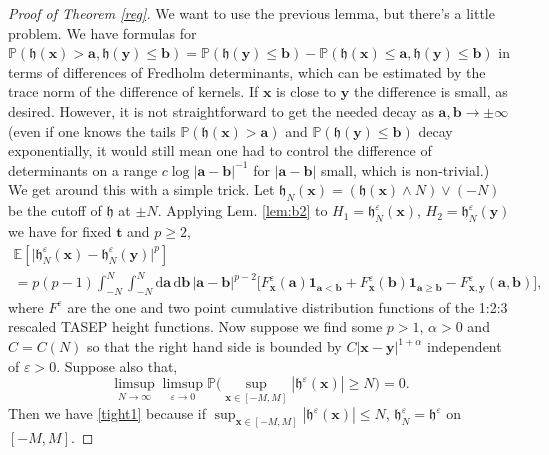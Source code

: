 \documentclass[letterpaper,reqno,11pt,oneside,final]{amsart}
\theoremstyle{definition}
\newcommand{\fh}{\mathfrak{h}}
\newcommand{\fb}{\mathbf{b}}
\newcommand{\pp}{\mathbb{P}}
\newcommand{\ee}{\mathbb{E}}
\newcommand{\uno}[1]{\mathbf{1}_{#1}}
\newcommand{\ep}{\varepsilon}
\renewcommand{\d}{\mathrm{d}}
\newcommand{\ft}{\mathbf{t}}
\newcommand{\fx}{\mathbf{x}}
\newcommand{\fy}{\mathbf{y}}
\newcommand{\fa}{\mathbf{a}}
\numberwithin{equation}{section}
\begin{document}
\begin{proof}[Proof of Theorem \ref{reg}]  We want to use the previous lemma, but there's a little problem.  We have  formulas for  $\pp(\fh(\fx) >\fa, \fh(\fy)\le \fb) = \pp( \fh(\fy)\le \fb)-\pp(\fh(\fx) \le \fa, \fh(\fy)\le\fb)$
in terms of differences of Fredholm determinants, which can be estimated by the trace norm of the difference of kernels.  If $\fx$ is close to $\fy$ the difference is small, as desired.
However, it is not straightforward to get the needed decay as $\fa,\fb\to \pm \infty$ (even if one knows the tails $\pp(\fh(\fx) >\fa)$ and $\pp( \fh(\fy)\le \fb)$ decay exponentially, it would still mean one had to control the difference of determinants on a range 
$c\log |\fa-\fb|^{-1}$ for $|\fa-\fb|$ small, which is non-trivial.)
We get around this with a simple trick.  Let $\fh_N(\fx) = (\fh(\fx)\wedge N)\vee (-N)$ be the cutoff of $\fh$ at $\pm N$.
Applying  Lem. \ref{lem:b2} to $H_1=\fh^\ep_N(\fx)$, $H_2=\fh^\ep_N(\fy)$ we have for fixed $\ft$ and $p\ge 2$,
\begin{multline}
\ee\! \left[ \bigl|\fh^\ep_N(\fx)-\fh^\ep_N(\fy)\bigr|^{ p}\right] \\
= p(p-1) \int_{-N}^N \int_{-N}^N \d\fa\,\d\fb\,|\fa-\fb|^{p-2} \bigl[F^\ep_\fx(\fa)\uno{\fa<\fb}+F^\ep_\fx(\fb)\uno{\fa\ge\fb} - F^\ep_{\fx, \fy}(\fa,\fb)\bigr],\label{eq:hoelder}
\end{multline}
where $F^\ep$ are the one and two point cumulative distribution functions of the 1:2:3 rescaled TASEP height functions.
Now suppose we find some $p>1$, $\alpha>0$ and $C=C(N)$ so that the right hand side is bounded by $C |\fx-\fy|^{1+\alpha}$
independent of $\ep>0$.  Suppose also that,
\begin{equation}\label{supbound}
\limsup_{N\to\infty}\limsup_{\ep\to0}\pp\bigg( \sup_{\fx\in [-M,M]}|\fh^\ep(\fx)|\ge N\bigg)=0.
\end{equation}
Then we have \eqref{tight1} because if $\sup_{\fx\in [-M,M]}|\fh^\ep(\fx)|\le N$, $\fh^\ep_N=\fh^\ep$ on $[-M,M]$.


\end{proof}
\end{document}
